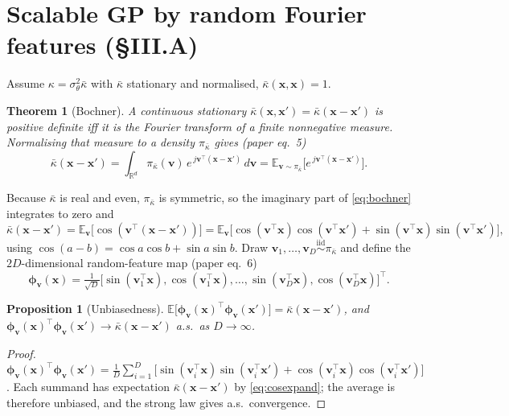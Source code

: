 \documentclass[11pt]{article}
\theoremstyle{plain}
\newtheorem{theorem}{Theorem}
\newtheorem{proposition}{Proposition}
\theoremstyle{definition}
\newcommand{\R}{\mathbb{R}}
\newcommand{\E}{\mathbb{E}}
\newcommand{\x}{\mathbf{x}}
\newcommand{\bphi}{\boldsymbol{\phi}}
\begin{document}
\section{Scalable GP by random Fourier features (\S III.A)}\label{sec:rff}
Assume $\kappa=\sigma_\theta^2\bar\kappa$ with $\bar\kappa$ stationary and normalised, $\bar\kappa(\x,\x)=1$.

\begin{theorem}[Bochner]\label{thm:bochner}
A continuous stationary $\bar\kappa(\x,\x')=\bar\kappa(\x-\x')$ is positive definite iff it is the Fourier transform of a finite nonnegative measure. Normalising that measure to a density $\pi_{\bar\kappa}$ gives (paper eq.~5)
\begin{equation}
\bar\kappa(\x-\x')=\int_{\R^d}\pi_{\bar\kappa}(\mathbf v)\,e^{\,j\mathbf v^\top(\x-\x')}\,d\mathbf v=\E_{\mathbf v\sim\pi_{\bar\kappa}}\!\big[e^{\,j\mathbf v^\top(\x-\x')}\big].
\label{eq:bochner}
\end{equation}
\end{theorem}

Because $\bar\kappa$ is real and even, $\pi_{\bar\kappa}$ is symmetric, so the imaginary part of \eqref{eq:bochner} integrates to zero and
\begin{equation}
\bar\kappa(\x-\x')=\E_{\mathbf v}\!\big[\cos(\mathbf v^\top(\x-\x'))\big]
=\E_{\mathbf v}\!\big[\cos(\mathbf v^\top\x)\cos(\mathbf v^\top\x')+\sin(\mathbf v^\top\x)\sin(\mathbf v^\top\x')\big],
\label{eq:cosexpand}
\end{equation}
using $\cos(a-b)=\cos a\cos b+\sin a\sin b$. Draw $\mathbf v_1,\dots,\mathbf v_D\stackrel{\text{iid}}{\sim}\pi_{\bar\kappa}$ and define the $2D$-dimensional random-feature map (paper eq.~6)
\begin{equation}
\bphi_{\mathbf v}(\x)=\tfrac{1}{\sqrt D}\big[\sin(\mathbf v_1^\top\x),\cos(\mathbf v_1^\top\x),\dots,\sin(\mathbf v_D^\top\x),\cos(\mathbf v_D^\top\x)\big]^\top.
\label{eq:rffmap}
\end{equation}
\begin{proposition}[Unbiasedness]\label{prop:unbiased}
$\E\big[\bphi_{\mathbf v}(\x)^\top\bphi_{\mathbf v}(\x')\big]=\bar\kappa(\x-\x')$, and $\bphi_{\mathbf v}(\x)^\top\bphi_{\mathbf v}(\x')\to\bar\kappa(\x-\x')$ a.s.\ as $D\to\infty$.
\end{proposition}
\begin{proof}
$\bphi_{\mathbf v}(\x)^\top\bphi_{\mathbf v}(\x')=\frac1D\sum_{i=1}^D\big[\sin(\mathbf v_i^\top\x)\sin(\mathbf v_i^\top\x')+\cos(\mathbf v_i^\top\x)\cos(\mathbf v_i^\top\x')\big]$. Each summand has expectation $\bar\kappa(\x-\x')$ by \eqref{eq:cosexpand}; the average is therefore unbiased, and the strong law gives a.s.\ convergence.
\end{proof}
\end{document}

